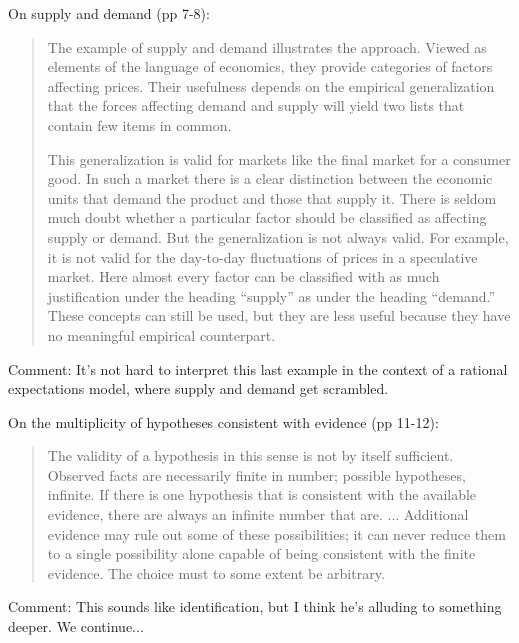 \documentclass[11pt,letterpaper]{article}
\begin{document}
On supply and demand (pp 7-8):
\begin{quote}
The example of supply and demand illustrates the approach.
Viewed as elements of the language of economics,
they provide categories of factors affecting prices.
Their usefulness depends on the empirical generalization that
the forces affecting demand and supply will yield two lists that contain
few items in common.

This generalization is valid for markets like the final market for a consumer good.
In such a market there is a clear distinction between
 the economic units that demand the product
and those that supply it.
There is seldom much doubt whether a particular factor should be classified
as affecting supply or demand.
But the generalization is not always valid.
For example, it is not valid for the day-to-day fluctuations of prices
in a speculative market.
Here almost every factor can be classified with as much justification
under the heading ``supply'' as under the heading ``demand.''
These concepts can still be used, but they are less useful
because they have no meaningful empirical counterpart.
\end{quote}
Comment:
It's not hard to interpret this last example in the context
of a rational expectations model, where supply and demand
get scrambled.


On the multiplicity of hypotheses consistent with evidence (pp 11-12):
\begin{quote}
The validity of a hypothesis in this sense is not by itself sufficient.
Observed facts are necessarily finite in number;
possible hypotheses, infinite.
If there is one hypothesis that is consistent with the available evidence,
there are always an infinite number that are. ...
Additional evidence may rule out some of these possibilities;
it can never reduce them to a single possibility alone capable of being consistent with the finite evidence.
The choice must to some extent be arbitrary.
\end{quote}
Comment: This sounds like identification, but I think he's alluding to
something deeper.
We continue...
\end{document}

